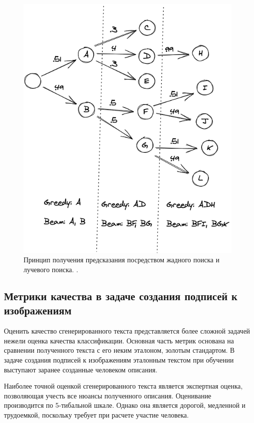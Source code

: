 \documentclass[a4paper,12pt]{extarticle}
\begin{document}
\begin{figure}[ht]
	\centering
	\includegraphics[scale=0.4]{beamsearch_vs_greedsearch.png}
	\caption{Принцип получения предсказания посредством жадного поиска и лучевого поиска.  \cite{https://vitalflux.com/greedy-search-vs-beam-search-decoding-concepts-examples/}.}
	\label{fig:beamsearch_vs_greedsearch}
\end{figure}

\subsection{Метрики качества в задаче создания подписей к изображениям}

Оценить качество сгенерированного текста представляется более сложной задачей нежели оценка качества классификации. Основная часть метрик основана на сравнении полученного текста с его неким эталоном, золотым стандартом. В задаче создания подписей к изображениям эталонным текстом при обучении выступают заранее созданные человеком описания.

Наиболее точной оценкой сгенерированного текста является экспертная оценка, позволяющая учесть все нюансы полученного описания. Оценивание производится по 5-тибальной шкале. Однако она является дорогой, медленной и трудоемкой, поскольку требует при расчете участие человека.
\end{document}
